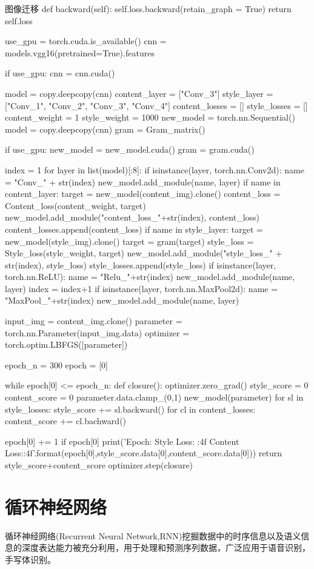 \documentclass[openbib]{article}
\begin{document}
\begin{Python}{图像迁移}
	def backward(self):
		self.loss.backward(retain_graph = True)
		return self.loss

use_gpu = torch.cuda.is_available()
cnn = models.vgg16(pretrained=True).features

if use_gpu:
	cnn = cnn.cuda()

model = copy.deepcopy(cnn)
content_layer = ["Conv_3"]
style_layer = ["Conv_1", "Conv_2", "Conv_3", "Conv_4"]
content_losses = []
style_losses = []
content_weight = 1
style_weight = 1000
new_model = torch.nn.Sequential()
model = copy.deepcopy(cnn)
gram = Gram_matrix()

if use_gpu:
	new_model = new_model.cuda()
	gram = gram.cuda()

index = 1
for layer in list(model)[:8]:
	if isinstance(layer, torch.nn.Conv2d):
		name = "Conv_" + str(index)
		new_model.add_module(name, layer)
		if name in content_layer:
			target = new_model(content_img).clone()
			content_loss = Content_loss(content_weight, target)
			new_model.add_module("content_loss_"+str(index), content_loss)
			content_losses.append(content_loss)
		if name in style_layer:
			target = new_model(style_img).clone()
			target = gram(target)
			style_loss = Style_loss(style_weight, target)
			new_model.add_module("style_loss_" + str(index), style_loss)
			style_losses.append(style_loss)
		if isinstance(layer, torch.nn.ReLU):
			name = "Relu_"+str(index)
			new_model.add_module(name, layer)
			index = index+1
		if isinstance(layer, torch.nn.MaxPool2d):
			name = "MaxPool_"+str(index)
			new_model.add_module(name, layer)

input_img = content_img.clone()
parameter = torch.nn.Parameter(input_img.data)
optimizer = torch.optim.LBFGS([parameter])

epoch_n = 300
epoch = [0]

while epoch[0] <= epoch_n:
	def closure():
		optimizer.zero_grad()
		style_score = 0
		content_score = 0
		parameter.data.clamp_(0,1)
		new_model(parameter)
		for sl in style_losses:
			style_score += sl.backward()
		for cl in content_losses:
			content_score += cl.bachward()

		epoch[0] += 1
		if epoch[0] %
			print('Epoch:{} Style Loss: {:4f} Content Loss:{:4f}'.format(epoch[0],style_score.data[0],content_score.data[0]))
		return style_score+content_score
	optimizer.step(closure)


\end{Python}
\section{循环神经网络}
循环神经网络(Recurrent Neural Network,RNN)挖掘数据中的时序信息以及语义信息的深度表达能力被充分利用，用于处理和预测序列数据，广泛应用于语音识别，手写体识别。
\end{document}
